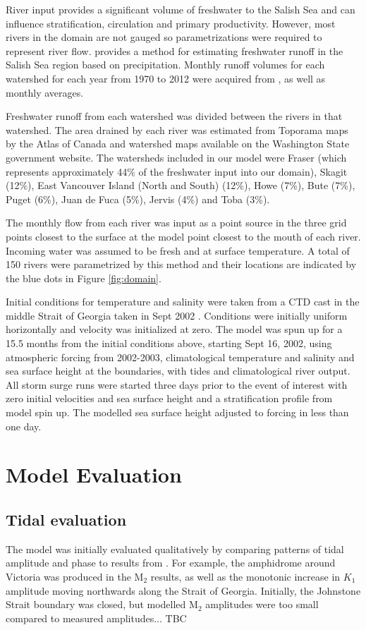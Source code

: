 \documentclass[pdftex,10pt]{article}
\begin{document}
River input provides a significant volume of freshwater to the Salish Sea and can influence stratification, circulation and primary productivity. However, most rivers in the domain are not gauged so parametrizations were required to represent river flow. \citet{morrison2011rivers} provides a method for estimating freshwater runoff in the Salish Sea region based on precipitation. Monthly runoff volumes for each watershed for each year from 1970 to 2012 were acquired from \citet{morrison2011rivers}, as well as monthly averages. 

Freshwater runoff from each watershed was divided between the rivers in that watershed. The area drained by each river was estimated from Toporama maps by the Atlas of Canada and watershed maps available on the Washington State government website. The watersheds included in our model were Fraser (which represents approximately 44\% of the freshwater input into our domain), Skagit (12\%), East Vancouver Island (North and South) (12\%), Howe (7\%), Bute (7\%), Puget (6\%), Juan de Fuca (5\%), Jervis (4\%) and Toba (3\%). 

The monthly flow from each river was input as a point source in the three grid points closest to the surface at the model point closest to the mouth of each river. Incoming water was assumed to be fresh and at surface temperature. A total of 150 rivers were parametrized by this method and their locations are indicated by the blue dots in Figure \ref{fig:domain}.

Initial conditions for temperature and salinity were taken from a CTD cast in the middle Strait of Georgia taken in Sept 2002 \citep{pawlowiczetal2007}.  Conditions were initially uniform horizontally and velocity was initialized at zero. The model was spun up for a 15.5 months from the initial conditions above, starting Sept 16, 2002, using atmospheric forcing from 2002-2003, climatological temperature and salinity and sea surface height at the boundaries, with tides and climatological river output.  All storm surge runs were started three days prior to the event of interest with zero initial velocities and sea surface height and a stratification profile from model spin up. The modelled sea surface height adjusted to forcing in less than one day. 

\section{Model Evaluation}\label{sec:model}

\subsection{Tidal evaluation}
The model was initially evaluated qualitatively by comparing patterns of tidal amplitude and phase to results from \citep{foreman1995tidal}. For example, the amphidrome around Victoria was produced in the M$_2$ results, as well as the monotonic increase in $K_1$ amplitude moving northwards along the Strait of Georgia. Initially, the Johnstone Strait boundary was closed, but modelled M$_2$ amplitudes were too small compared to measured amplitudes... TBC
\end{document}

